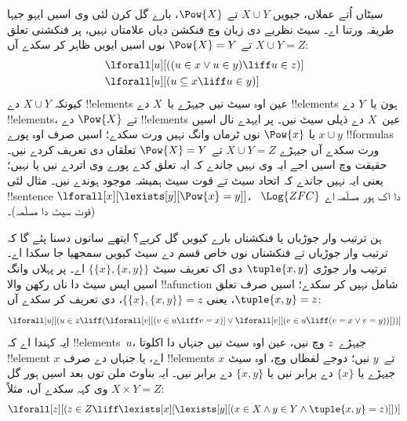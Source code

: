 \documentclass[../../../include/open-logic-section]{subfiles}
\begin{document}
سیٹاں اُتے عملاں، جیویں $X \cup Y$ تے $\Pow{X}$، بارے گل
کرن لئی وی اسیں ایہو جیہا طریقہ ورتنا اے۔ سیٹ نظریے دی
زبان وچ فنکشن دیاں علامتاں نہیں، پر فنکشنی تعلق
$X \cup Y = Z$ تے $\Pow{X} = Y$ نوں اسیں ایویں ظاہر
کر سکدے آں:
\begin{align*}
& \lforall[u][((u \in x \lor u \in y) \liff u \in z)]\\
& \lforall[u][(u \subseteq x \liff u \in y )]
\end{align*}
کیونکہ $X \cup Y$ دے !!{element}s عین اوہ سیٹ نیں جیہڑے
یا~$X$ دے !!{element}s ہون یا~$Y$ دے !!{element}s،
تے $\Pow{X}$ دے !!{element}s عین~$X$ دے ذیلی سیٹ نیں۔
پر ایہدے نال اسیں $x \cup y$ یا $\Pow{x}$ نوں ٹرماں وانگ
نہیں ورت سکدے؛ اسیں صرف اوہ پورے !!{formula}s ورت سکدے
آں جیہڑے $X \cup Y = Z$ تے $\Pow{X} = Y$ تعلقاں دی
تعریف کردے نیں۔ حقیقت وچ اسیں اجے ایہ وی نہیں جاندے کہ
ایہ تعلق کدے پورے وی اتردے نیں یا نہیں؛ یعنی ایہ نہیں
جاندے کہ اتحاد سیٹ تے قوت سیٹ ہمیشہ موجود ہوندے نیں۔
مثال لئی !!{sentence}
$\lforall[x][\lexists[y][\Pow{x} = y]]$،
~$\Log{ZFC}$ دا اک ہور مسلّمہ اے (قوت سیٹ دا مسلّمہ)۔

ہن ترتیب وار جوڑیاں یا فنکشناں بارے کیویں گل کریے؟ ایتھے
سانوں دسنا پئے گا کہ ترتیب وار جوڑیاں تے فنکشناں نوں
خاص قسم دے سیٹ کیویں سمجھیا جا سکدا اے۔ ترتیب وار جوڑی
$\tuple{x, y}$ دی اک تعریف سیٹ $\{\{x\}, \{x, y\}\}$
اے۔ پر پہلاں وانگ اسیں ایس سیٹ دا ناں رکھن والا
!!a{function} شامل نہیں کر سکدے؛ اسیں صرف تعلق
$\tuple{x, y} = z$، یعنی $\{\{x\}, \{x, y\}\} = z$،
دی تعریف کر سکدے آں:
\[
\lforall[u][(u \in z \liff (\lforall[v][(v \in u \liff v = x)] \lor
  \lforall[v][(v \in u \liff (v = x \lor v = y))]))]
\]
ایہ کہندا اے کہ !!{element}s~$u$، جیہڑے~$z$ وچ نیں، عین اوہ سیٹ
نیں جنہاں دا اکلوتا !!{element} $x$ اے، یا جنہاں دے
صرف !!{element}s $x$ تے~$y$ نیں؛ دوجے لفظاں وچ،
اوہ سیٹ جیہڑے یا $\{x\}$ دے برابر نیں یا
$\{x, y\}$ دے برابر نیں۔ ایہ بناوٹ ملن توں بعد اسیں
ہور گل وی کہہ سکدے آں، مثلاً $X \times Y = Z$:
\[
\lforall[z][(z \in Z \liff \lexists[x][\lexists[y][(x \in
        X \land y \in Y \land \tuple{x, y} = z)]])]
\]
\end{document}
